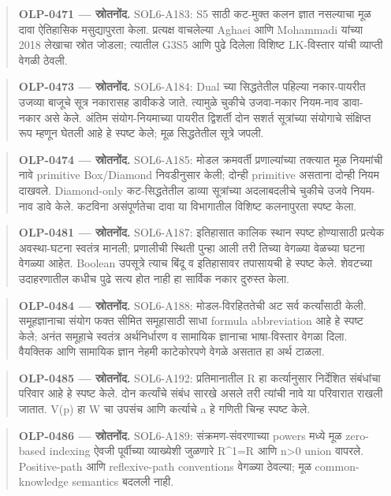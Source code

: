 \begin{quote}\small\textbf{OLP-0471 — स्रोतनोंद.} SOL6-A183: S5 साठी कट-मुक्त कलन ज्ञात नसल्याचा मूळ दावा ऐतिहासिक मसुद्यापुरता केला. प्रत्यक्ष वाचलेल्या Aghaei आणि Mohammadi यांच्या 2018 लेखाचा स्रोत जोडला; त्यातील G3S5 आणि पुढे दिलेला विशिष्ट LK-विस्तार यांची व्याप्ती वेगळी ठेवली.\end{quote}
\begin{quote}\small\textbf{OLP-0473 — स्रोतनोंद.} SOL6-A184: Dual च्या सिद्धतेतील पहिल्या नकार-पायरीत उजव्या बाजूचे सूत्र नकारासह डावीकडे जाते. त्यामुळे चुकीचे उजवा-नकार नियम-नाव डावा-नकार असे केले. अंतिम संयोग-नियमाच्या पायरीत द्विशर्ती दोन सशर्त सूत्रांच्या संयोगाचे संक्षिप्त रूप म्हणून घेतली आहे हे स्पष्ट केले; मूळ सिद्धतेतील सूत्रे जपली.\end{quote}
\begin{quote}\small\textbf{OLP-0474 — स्रोतनोंद.} SOL6-A185: मोडल क्रमवर्ती प्रणाल्यांच्या तक्त्यात मूळ नियमांची नावे primitive Box/Diamond निवडीनुसार केली; दोन्ही primitive असताना दोन्ही नियम दाखवले. Diamond-only कट-सिद्धतेतील डाव्या सूत्रांच्या अदलाबदलीचे चुकीचे उजवे नियम-नाव डावे केले. कटविना असंपूर्णतेचा दावा या विभागातील विशिष्ट कलनापुरता स्पष्ट केला.\end{quote}
\begin{quote}\small\textbf{OLP-0481 — स्रोतनोंद.} SOL6-A187: इतिहासात कालिक स्थान स्पष्ट होण्यासाठी प्रत्येक अवस्था-घटना स्वतंत्र मानली; प्रणालीची स्थिती पुन्हा आली तरी तिच्या वेगळ्या वेळच्या घटना वेगळ्या आहेत. Boolean उपसूत्रे त्याच बिंदू व इतिहासावर तपासायची हे स्पष्ट केले. शेवटच्या उदाहरणातील कधीच पुढे सत्य होत नाही हा सार्विक नकार दुरुस्त केला.\end{quote}
\begin{quote}\small\textbf{OLP-0484 — स्रोतनोंद.} SOL6-A188: मोडल-विरहिततेची अट सर्व कर्त्यांसाठी केली. समूहज्ञानाचा संयोग फक्त सीमित समूहासाठी साधा formula abbreviation आहे हे स्पष्ट केले; अनंत समूहाचे स्वतंत्र अर्थनिर्धारण व सामायिक ज्ञानाचा भाषा-विस्तार वेगळा दिला. वैयक्तिक आणि सामायिक ज्ञान नेहमी काटेकोरपणे वेगळे असतात हा अर्थ टाळला.\end{quote}
\begin{quote}\small\textbf{OLP-0485 — स्रोतनोंद.} SOL6-A192: प्रतिमानातील R हा कर्त्यानुसार निर्देशित संबंधांचा परिवार आहे हे स्पष्ट केले. दोन कर्त्यांचे संबंध सारखे असले तरी त्यांची नावे या परिवारात राखली जातात. V(p) हा W चा उपसंच आणि कर्त्याचे a हे गणिती चिन्ह स्पष्ट केले.\end{quote}
\begin{quote}\small\textbf{OLP-0486 — स्रोतनोंद.} SOL6-A189: संक्रमण-संवरणाच्या powers मध्ये मूळ zero-based indexing ऐवजी पूर्वीच्या व्याख्येशी जुळणारे R\textasciicircum{}1=R आणि n>0 union वापरले. Positive-path आणि reflexive-path conventions वेगळ्या ठेवल्या; मूळ common-knowledge semantics बदलली नाही.\end{quote}
